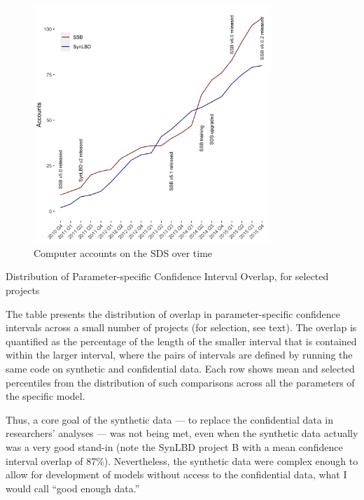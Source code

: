\documentclass[inline]{hdsr}
\begin{document}
\begin{figure}
    \centering
    \includegraphics[width=0.8\textwidth]{accounts-2015.png}
    \caption{Computer accounts on the SDS over time}
    \label{fig:growth_in_sds}
\end{figure}

\begin{table}[]
    \centering
    \begin{threeparttable}
        
        \caption{Distribution of Parameter-specific Confidence Interval Overlap, for selected projects}
        \label{tab:overlap}
        \begin{tablenotes}
            \footnotesize
            \item[] The table presents the distribution of overlap in parameter-specific confidence intervals \citep{tas2006} across a small number of projects (for selection, see text). The overlap is quantified as the percentage of the length of the smaller interval that is contained within the larger interval, where the pairs of intervals are defined by running the same code on synthetic and confidential data. Each row shows mean and selected percentiles from the distribution of such comparisons across all the parameters of the specific model. 
        \end{tablenotes}
    \end{threeparttable}
\end{table}
Thus, a core goal of the synthetic data --- to replace the confidential data in researchers' analyses --- was not being met, even when the synthetic data actually was a very good stand-in (note the SynLBD project B with a mean confidence interval overlap of 87\%). Nevertheless, the synthetic data were complex enough to allow for development of models without access to the confidential data, what I would call ``good enough data.''
\end{document}
